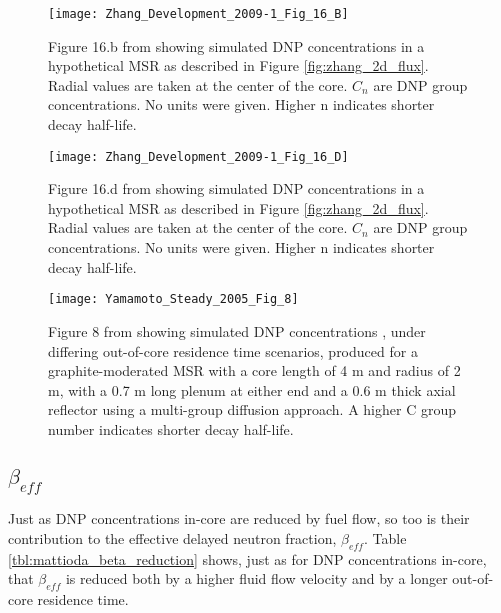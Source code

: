 \documentclass[review]{elsarticle}
\begin{document}
\begin{figure}[H]
   \centering
   \texttt{[image: Zhang\_Development\_2009-1\_Fig\_16\_B]}
   \caption{Figure 16.b from \cite{zhang_development_2009-1} showing simulated DNP concentrations
               in a hypothetical MSR as described in Figure \ref{fig:zhang_2d_flux}.
               Radial 
               values are taken at the center of the core. $C_{n}$ are DNP
               group concentrations. No units were given. Higher n indicates
               shorter decay half-life.}
   \label{fig:zhang_radial_velocity_dnp_1}
\end{figure}

\begin{figure}[H]
   \centering
   \texttt{[image: Zhang\_Development\_2009-1\_Fig\_16\_D]}
   \caption{Figure 16.d from \cite{zhang_development_2009-1} showing simulated DNP concentrations
               in a hypothetical MSR as described in Figure \ref{fig:zhang_2d_flux}.
               Radial
               values are taken at the center of the core. $C_{n}$ are DNP
               group concentrations. No units were given. Higher n indicates
               shorter decay half-life.}
   \label{fig:zhang_radial_velocity_dnp_2}
\end{figure}

\begin{figure}[H]
   \centering
   \texttt{[image: Yamamoto\_Steady\_2005\_Fig\_8]}
   \caption{Figure 8 from \cite{yamamoto_steady_2005} showing simulated DNP
     concentrations
    , under differing out-of-core residence time scenarios, produced for
    a graphite-moderated MSR with a core length of 4 m and radius of 2 m,
    with a 0.7 m long 
    plenum at either end and a 0.6 m thick axial reflector using a
    multi-group diffusion approach. A higher C group number indicates
    shorter decay half-life.}
   \label{fig:yamamoto_transit_time}
\end{figure}

\subsection{$\beta_{eff}$} \label{ssec:beta}
Just as DNP concentrations in-core are reduced by fuel flow, so too is their
contribution to the effective delayed neutron fraction, $\beta_{eff}$.
Table \ref{tbl:mattioda_beta_reduction} shows, just as for DNP concentrations
in-core, that $\beta_{eff}$ is reduced both by a higher fluid flow velocity and
by a longer out-of-core residence time.
\end{document}
